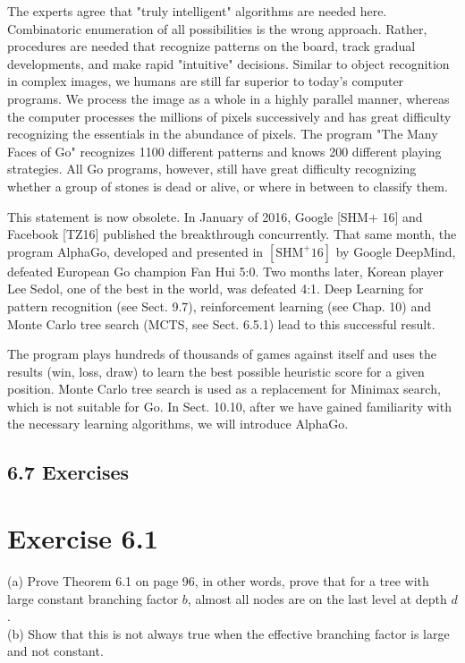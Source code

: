 \documentclass[10pt]{book}
\begin{document}
\begin{center}
\begin{enumerate}
\begin{displayquote}
The experts agree that "truly intelligent" algorithms are needed here. Combinatoric enumeration of all possibilities is the wrong approach. Rather, procedures are needed that recognize patterns on the board, track gradual developments, and make rapid "intuitive" decisions. Similar to object recognition in complex images, we humans are still far superior to today's computer programs. We process the image as a whole in a highly parallel manner, whereas the computer processes the millions of pixels successively and has great difficulty recognizing the essentials in the abundance of pixels. The program "The Many Faces of Go" recognizes 1100 different patterns and knows 200 different playing strategies. All Go programs, however, still have great difficulty recognizing whether a group of stones is dead or alive, or where in between to classify them.
\end{displayquote}

This statement is now obsolete. In January of 2016, Google [SHM+ 16] and Facebook [TZ16] published the breakthrough concurrently. That same month, the program AlphaGo, developed and presented in $\left[\mathrm{SHM}^{+} 16\right]$ by Google DeepMind, defeated European Go champion Fan Hui 5:0. Two months later, Korean player Lee Sedol, one of the best in the world, was defeated 4:1. Deep Learning for pattern recognition (see Sect. 9.7), reinforcement learning (see Chap. 10) and Monte Carlo tree search (MCTS, see Sect. 6.5.1) lead to this successful result.


The program plays hundreds of thousands of games against itself and uses the results (win, loss, draw) to learn the best possible heuristic score for a given position. Monte Carlo tree search is used as a replacement for Minimax search, which is not suitable for Go. In Sect. 10.10, after we have gained familiarity with the necessary learning algorithms, we will introduce AlphaGo.

\subsection*{6.7 Exercises}
\section*{Exercise 6.1}
(a) Prove Theorem 6.1 on page 96, in other words, prove that for a tree with large constant branching factor $b$, almost all nodes are on the last level at depth $d$.\\
(b) Show that this is not always true when the effective branching factor is large and not constant.


\end{enumerate}
\end{center}
\end{document}

